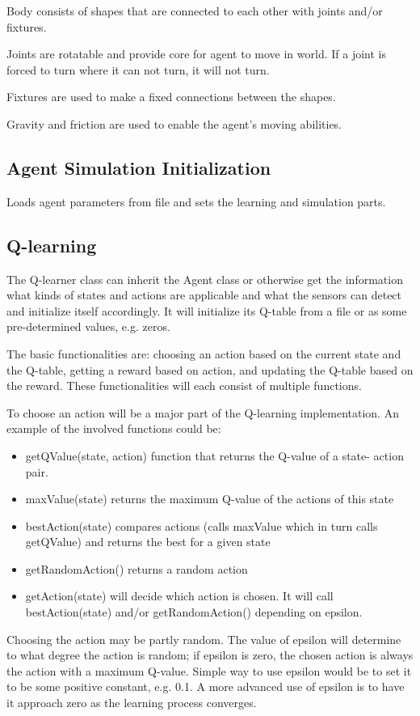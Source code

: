 \documentclass{article}
\begin{document}
Body consists of shapes that are connected to each other with joints and/or fixtures.

Joints are rotatable and provide core for agent to move in world. If a joint is 
forced to turn where it can not turn, it will not turn. 

Fixtures are used to make a fixed connections between the shapes.

Gravity and friction are used to enable the agent's moving abilities.

\subsection{Agent Simulation Initialization}
Loads agent parameters from file and sets the learning and simulation parts.


\subsection{Q-learning}
The Q-learner class can inherit the Agent class or otherwise get the information
what kinds of states and actions are applicable and what the sensors can detect
and initialize itself accordingly. It will initialize its Q-table from a file or
as some pre-determined values, e.g. zeros.

The basic functionalities are: choosing an action based on the current state and
the Q-table, getting a reward based on action, and updating the Q-table based on
the reward. These functionalities will each consist of multiple functions.

To choose an action will be a major part of the Q-learning implementation. An
example of the involved functions could be:
\begin{itemize}
  \item getQValue(state, action) function that returns the Q-value of a state-
    action pair.
  \item maxValue(state) returns the maximum Q-value of the actions of this state
  \item bestAction(state) compares actions (calls maxValue which in turn calls
    getQValue) and returns the best for a given state
  \item getRandomAction() returns a random action
  \item getAction(state) will decide which action is chosen. It will call
    bestAction(state) and/or getRandomAction() depending on epsilon.
\end{itemize}
Choosing the action may be partly random. The value of epsilon will determine to
what degree the action is random; if epsilon is zero, the chosen action is always
the action with a maximum Q-value. Simple way to use epsilon would be to set it
to be some positive constant, e.g. 0.1. A more advanced use of epsilon is to have
it approach zero as the learning process converges.
\end{document}

